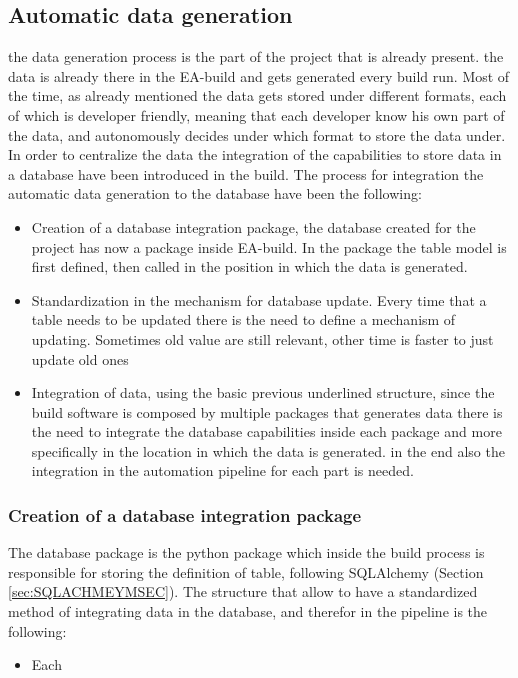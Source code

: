 \documentclass[../main.tex]{subfiles}
\begin{document}
\subsection{Automatic data generation}
the data generation process is the part of the project that is already present. the data is already there in the EA-build and gets generated every build run. Most of the time, as already mentioned the data gets stored under different formats, each of which is developer friendly, meaning that each developer know his own part of the data, and autonomously decides under which format to store the data under. 
In order to centralize the data the integration of the capabilities to store data in a database have been introduced in the build. The process for integration the automatic data generation to the database have been the following:
\begin{itemize}
    \item Creation of a database integration package, the database created for the project has now a package inside EA-build. In the package the table model is first defined, then called in the position in which the data is generated.
    \item Standardization in the mechanism for database update. Every time that a table needs to be updated there is the need to define a mechanism of updating. Sometimes old value are still relevant, other time is faster to just update old ones
    \item Integration of data, using the basic previous underlined structure, since the build software is composed by multiple packages that generates data there is the need to integrate the database capabilities inside each package and more specifically in the location in which the data is generated. in the end also the integration in the automation pipeline for each part is needed.
\end{itemize}
\subsubsection{Creation of a database integration package}
The database package is the python package which inside the build process is responsible for storing the definition of table, following SQLAlchemy (Section \ref{sec:SQLACHMEYMSEC}).
The structure that allow to have a standardized method of integrating data in the database, and therefor in the pipeline is the following:
\begin{itemize}
    \item Each 
\end{itemize}
\end{document}
